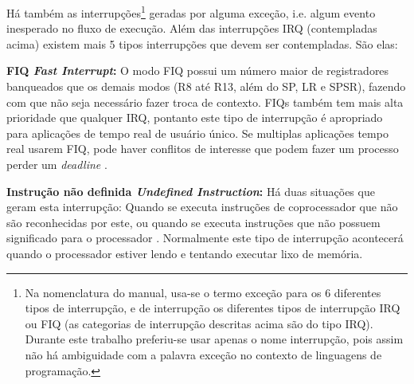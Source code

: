 \documentclass{ufscThesis/ufscThesis} %
\begin{document}
Há também as interrupções\footnote{Na nomenclatura do manual, usa-se o termo exceção para os 6 diferentes tipos de interrupção, e de interrupção os diferentes tipos de interrupção IRQ ou FIQ (as categorias de interrupção descritas acima são do tipo IRQ). Durante este trabalho preferiu-se usar apenas o nome interrupção, pois assim não há ambiguidade com a palavra exceção no contexto de linguagens de programação.} geradas por alguma exceção, i.e. algum evento inesperado no fluxo de execução. Além das interrupções IRQ (contempladas acima) existem mais 5 tipos interrupções que devem ser contempladas. São elas:

\textbf{FIQ \emph{Fast Interrupt}:} O modo FIQ possui um número maior de registradores banqueados que os demais modos (R8 até R13, além do SP, LR e SPSR), fazendo com que não seja necessário fazer troca de contexto. FIQs também tem mais alta prioridade que qualquer IRQ, pontanto este tipo de interrupção é apropriado para aplicações de tempo real de usuário único. Se multiplas aplicações tempo real usarem FIQ, pode haver conflitos de interesse que podem fazer um processo perder um \emph{deadline} \cite[p.~66]{armarm}.


\textbf{Instrução não definida \emph{Undefined Instruction}:} 
Há duas situações que geram esta interrupção: Quando se executa instruções de coprocessador que não são reconhecidas por este, ou quando se executa instruções que não possuem significado para o processador \cite[p.~36]{armarm}. Normalmente este tipo de interrupção acontecerá quando o processador estiver lendo e tentando executar lixo de memória.
\end{document}
